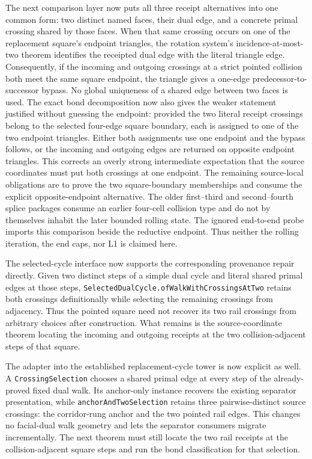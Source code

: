 \documentclass[11pt]{article}
\theoremstyle{definition}
\begin{document}
The next comparison layer now puts all three receipt alternatives into one
common form: two distinct named faces, their dual edge, and a concrete primal
crossing shared by those faces.  When that same crossing occurs on one of the
replacement square's endpoint triangles, the rotation system's
incidence-at-most-two theorem identifies the receipted dual edge with the
literal triangle edge.  Consequently, if the incoming and outgoing crossings
at a strict pointed collision both meet the same square endpoint, the triangle
gives a one-edge predecessor-to-successor bypass.  No global uniqueness of a
shared edge between two faces is used.  The exact bond decomposition now also
gives the weaker statement justified without guessing the endpoint: provided
the two literal receipt crossings belong to the selected four-edge square
boundary, each is assigned to one of the two endpoint triangles.  Either both
assignments use one endpoint and the bypass follows, or the incoming and
outgoing edges are returned on opposite endpoint triangles.  This corrects an
overly strong intermediate expectation that the source coordinates must put
both crossings at one endpoint.  The remaining source-local obligations are
to prove the two square-boundary memberships and consume the explicit
opposite-endpoint alternative.  The older first--third and second--fourth
splice packages consume an earlier four-cell collision type and do not by
themselves inhabit the later bounded rolling state.  The ignored end-to-end
probe imports this comparison beside the reductive endpoint.  Thus neither
the rolling iteration, the end caps, nor L1 is claimed here.

The selected-cycle interface now supports the corresponding provenance repair
directly.  Given two distinct steps of a simple dual cycle and literal shared
primal edges at those steps,
\texttt{SelectedDualCycle.ofWalkWithCrossingsAtTwo} retains both crossings
definitionally while selecting the remaining crossings from adjacency.  Thus
the pointed square need not recover its two rail crossings from arbitrary
choices after construction.  What remains is the source-coordinate theorem
locating the incoming and outgoing receipts at the two collision-adjacent
steps of that square.

The adapter into the established replacement-cycle tower is now explicit as
well.  A \texttt{CrossingSelection} chooses a shared primal edge at every step
of the already-proved fixed dual walk.  Its anchor-only instance recovers the
existing separator presentation, while
\texttt{anchorAndTwoSelection} retains three pairwise-distinct source
crossings: the corridor-rung anchor and the two pointed rail edges.  This
changes no facial-dual walk geometry and lets the separator consumers migrate
incrementally.  The next theorem must still locate the two rail receipts at
the collision-adjacent square steps and run the bond classification for that
selection.
\end{document}
